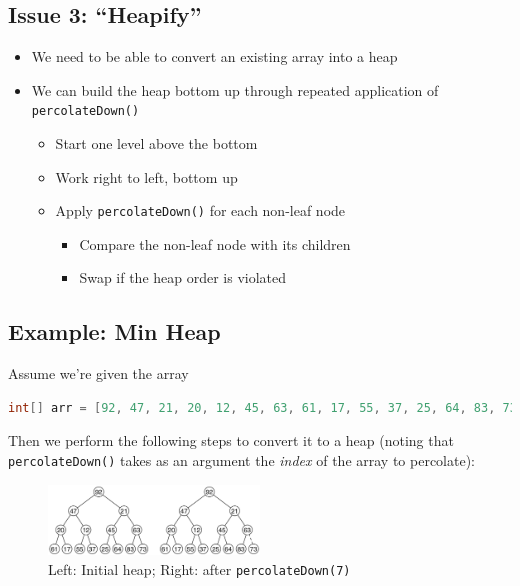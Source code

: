 \documentclass[
  10pt,
  english,
  letterpaper,
,tablecaptionabove
]{scrartcl}
\newcommand{\passthrough}[1]{#1}
\providecommand{\tightlist}{%
  \setlength{\itemsep}{0pt}\setlength{\parskip}{0pt}}
\begin{document}
\hypertarget{issue-3-heapify}{%
\subsection{\texorpdfstring{Issue 3:
\enquote{Heapify}}{Issue 3: ``Heapify''}}\label{issue-3-heapify}}

\begin{itemize}
\tightlist
\item
  We need to be able to convert an existing array into a heap
\item
  We can build the heap bottom up through repeated application of
  \passthrough{\lstinline!percolateDown()!}

  \begin{itemize}
  \tightlist
  \item
    Start one level above the bottom
  \item
    Work right to left, bottom up
  \item
    Apply \passthrough{\lstinline!percolateDown()!} for each non-leaf
    node

    \begin{itemize}
    \tightlist
    \item
      Compare the non-leaf node with its children
    \item
      Swap if the heap order is violated
    \end{itemize}
  \end{itemize}
\end{itemize}

\hypertarget{example-min-heap}{%
\subsection{Example: Min Heap}\label{example-min-heap}}

Assume we're given the array

\begin{lstlisting}[language=Java]
int[] arr = [92, 47, 21, 20, 12, 45, 63, 61, 17, 55, 37, 25, 64, 83, 73];
\end{lstlisting}

Then we perform the following steps to convert it to a heap (noting that
\passthrough{\lstinline!percolateDown()!} takes as an argument the
\emph{index} of the array to percolate):

\begin{figure}
\centering
\includegraphics[width=0.5\textwidth,height=\textheight]{images/10.png}
\caption{Left: Initial heap; Right: after
\passthrough{\lstinline!percolateDown(7)!}}
\end{figure}
\end{document}
